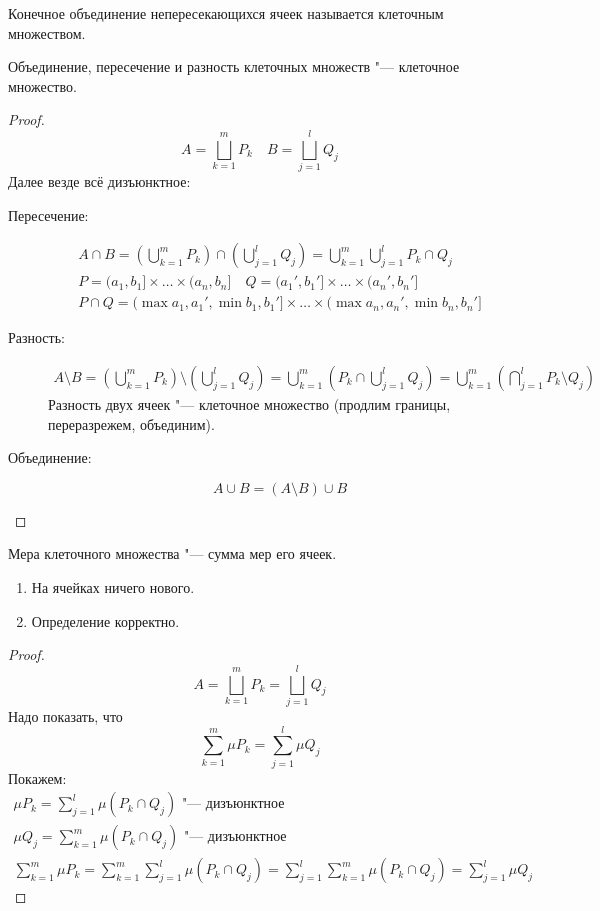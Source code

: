 \begin{Def}
	Конечное объединение непересекающихся ячеек называется клеточным множеством.
\end{Def}
\begin{lemma}
	Объединение, пересечение и разность клеточных множеств "--- клеточное множество.
\end{lemma}
\begin{proof}
	\[ A = \bigsqcup_{k=1}^m P_k \quad B = \bigsqcup_{j=1}^l Q_j \]
	Далее везде всё дизъюнктное:
	\begin{description}
	\item[Пересечение:]
		\begin{gather*}
			A \cap B = \left(\bigcup_{k=1}^m P_k\right) \cap \left(\bigcup_{j=1}^l Q_j\right)
				= \bigcup_{k=1}^m \bigcup_{j=1}^l P_k \cap Q_j \\
			P = (a_1, b_1] \times \dots \times (a_n, b_n] \quad Q = (a_1', b_1'] \times \dots \times (a_n', b_n'] \\
			P \cap Q = (\max{a_1, a_1'}, \min{b_1, b_1'}] \times \dots \times (\max{a_n, a_n'}, \min{b_n, b_n'}]
		\end{gather*}

	\item[Разность:]
		\begin{gather*}
			A \setminus B = \left(\bigcup_{k=1}^m P_k\right) \setminus \left(\bigcup_{j=1}^l Q_j\right)
				= \bigcup_{k=1}^m \left( P_k \cap \bigcup_{j=1}^l Q_j \right) = \bigcup_{k=1}^m \left( \bigcap_{j=1}^l P_k \setminus Q_j \right)
		\end{gather*}
		Разность двух ячеек "--- клеточное множество (продлим границы, переразрежем, объединим).

	\item[Объединение:]
		\[ A \cup B = (A \setminus B) \cup B \]
	\end{description}
\end{proof}

\begin{Def}
	Мера клеточного множества "--- сумма мер его ячеек.
\end{Def}
\begin{assertion}
	\begin{enumerate}
		\item На ячейках ничего нового.
		\item Определение корректно.
	\end{enumerate}
\end{assertion}
\begin{proof}
	\[ A = \bigsqcup_{k=1}^m P_k = \bigsqcup_{j=1}^l Q_j \]
	Надо показать, что
	\[ \sum_{k=1}^m \mu P_k = \sum_{j=1}^l \mu Q_j \]
	Покажем:
	\begin{gather*}
		\mu P_k = \sum_{j=1}^l \mu (P_k \cap Q_j) \text{ "--- дизъюнктное} \\
		\mu Q_j = \sum_{k=1}^m \mu (P_k \cap Q_j) \text{ "--- дизъюнктное} \\
		\sum_{k=1}^m \mu P_k = \sum_{k=1}^m \sum_{j=1}^l \mu (P_k \cap Q_j)
			= \sum_{j=1}^l \sum_{k=1}^m \mu (P_k \cap Q_j) = \sum_{j=1}^l \mu Q_j
	\end{gather*}
\end{proof}